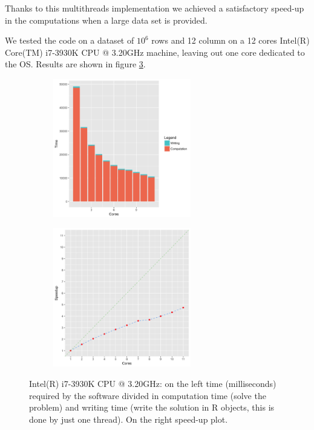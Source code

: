 Thanks to this multithreads implementation we achieved a satisfactory speed-up in the computations when a large data set is provided.

We tested the code on a dataset of $10^{6}$ rows and 12 column on a 12 cores Intel(R) Core(TM) i7-3930K CPU @ 3.20GHz machine, leaving out one core dedicated to the OS. Results are shown in figure \ref{fig:giuspo12}.

\begin{figure}[ht]
	
	\begin{subfigure}{.5\textwidth}
		\includegraphics[width=6cm]{./pictures/openmp/giuspo12_time.png} 
		\label{fig:subim1}
	\end{subfigure}
	\begin{subfigure}{.5\textwidth}
		\includegraphics[width=6cm]{./pictures/openmp/giuspo12_speedup.png}
		\label{fig:subim2}
	\end{subfigure}
	
	\caption{Intel(R) i7-3930K CPU @ 3.20GHz: on the left time (milliseconds) required by the software divided in computation time (solve the problem) and writing time (write the solution in R objects, this is done by just one thread). On the right speed-up plot.}
	\label{fig:giuspo12}
	
\end{figure}


